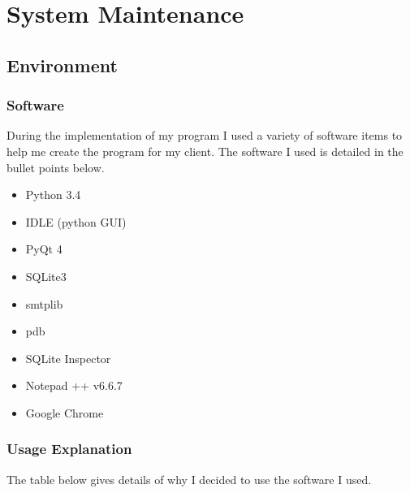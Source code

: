 \chapter{System Maintenance}

\section{Environment}

\subsection{Software}

During the implementation of my program I used a variety of software items to help me create the program for my client. The software I used is detailed in the bullet points below.

\begin{itemize}
\item Python 3.4
\item IDLE (python GUI)
\item PyQt 4
\item SQLite3
\item smtplib
\item pdb
\item SQLite Inspector
\item Notepad ++ v6.6.7
\item Google Chrome
\end{itemize}

\subsection{Usage Explanation}

The table below gives details of why I decided to use the software I used. 

